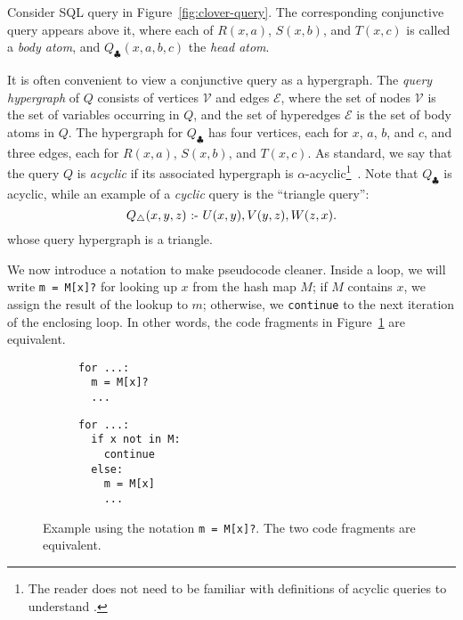 \begin{example} \label{ex:triangle}
  Consider SQL query in Figure~\ref{fig:clover-query}.
  The corresponding conjunctive query appears above it,
  where each of $R(x, a)$, $S(x, b)$, and $T(x, c)$
  is called a {\em body atom}, and $Q_\clubsuit(x, a, b, c)$
  the {\em head atom}.
\end{example}

It is often convenient to view a conjunctive query as
a hypergraph.  The \emph{query hypergraph} of $Q$ consists of vertices
$\mathcal{V}$ and edges $\mathcal{E}$, where the set of nodes
$\mathcal{V}$ is the set of variables occurring in $Q$, and the set of
hyperedges $\mathcal{E}$ is the set of body atoms in $Q$.
The hypergraph for $Q_\clubsuit$ has four vertices, each for
$x$, $a$, $b$, and $c$,
and three edges, each for $R(x, a)$, $S(x, b)$, and $T(x, c)$.
As standard, we
say that the query $Q$ is {\em acyclic} if its associated hypergraph
is $\alpha$-acyclic\footnote{The reader does not need to be familiar
  with definitions of acyclic queries to understand \FJ.}~\cite{DBLP:journals/jacm/Fagin83}.
Note that $Q_\clubsuit$ is acyclic,
while an example of a {\em cyclic} query is the ``triangle query'':
$$Q_\triangle(x, y, z) \text{ :- } U(x, y), V(y, z), W(z, x).$$
whose query hypergraph is a triangle.

We now introduce a notation to make pseudocode cleaner.
Inside a loop,
we will write \lstinline|m = M[x]?|
for looking up $x$ from the hash map $M$;
if $M$ contains $x$, we assign the result of the lookup
to $m$; otherwise, we \lstinline|continue| to the next iteration
of the enclosing loop.
In other words, the code fragments in Figure~\ref{fig:lookup-notation}
are equivalent.
\begin{figure}
  \begin{subfigure}[t]{0.5\linewidth}
    \begin{lstlisting}
for ...:
  m = M[x]?
  ...
\end{lstlisting}
  \end{subfigure}
  \begin{subfigure}[t]{.45\linewidth}
    \begin{lstlisting}
for ...:
  if x not in M: 
    continue
  else: 
    m = M[x]
    ...
\end{lstlisting}
  \end{subfigure}
  \caption{Example using the notation \lstinline|m = M[x]?|.
    The two code fragments are equivalent.}
  \label{fig:lookup-notation}
\end{figure}

